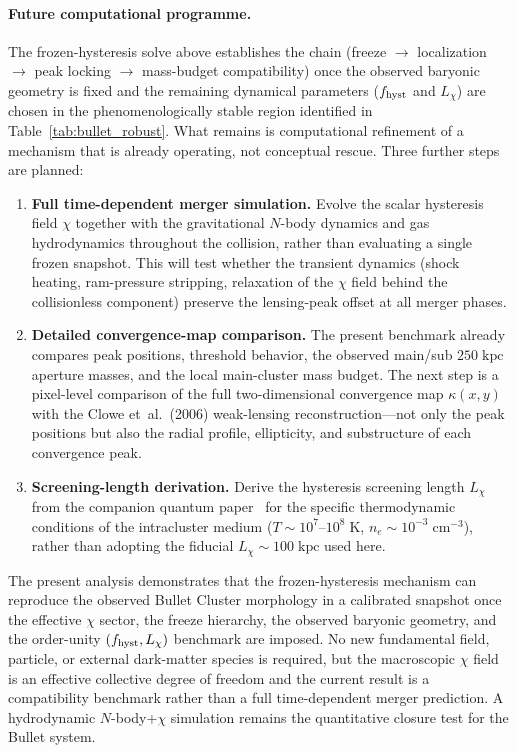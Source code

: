 \documentclass[11pt]{article}
\begin{document}
\paragraph{Future computational programme.}
The frozen-hysteresis solve above establishes the chain
(freeze $\to$ localization $\to$ peak locking $\to$
mass-budget compatibility) once the observed baryonic
geometry is fixed and the remaining dynamical parameters
($f_{\rm hyst}$ and $L_\chi$) are chosen in the
phenomenologically stable region identified in
Table~\ref{tab:bullet_robust}.
What remains is computational refinement of a mechanism that
is already operating, not conceptual rescue.  Three further
steps are planned:
\begin{enumerate}
  \item \textbf{Full time-dependent merger simulation.}
    Evolve the scalar hysteresis field $\chi$ together with the
    gravitational $N$-body dynamics and gas hydrodynamics throughout
    the collision, rather than evaluating a single frozen snapshot.
    This will test whether the transient dynamics (shock heating,
    ram-pressure stripping, relaxation of the $\chi$ field behind the
    collisionless component) preserve the lensing-peak offset at all
    merger phases.
  \item \textbf{Detailed convergence-map comparison.}
    The present benchmark already compares peak positions, threshold
    behavior, the observed main/sub $250\;\mathrm{kpc}$ aperture
    masses, and the local main-cluster mass budget.  The next step is a
    pixel-level comparison of the full two-dimensional convergence map
    $\kappa(x,y)$ with the Clowe et~al.\ (2006) weak-lensing
    reconstruction---not only the peak positions but also the radial
    profile, ellipticity, and substructure of each convergence peak.
  \item \textbf{Screening-length derivation.}
    Derive the hysteresis screening length $L_\chi$ from the companion
    quantum paper~\cite{Lotishvili2026Q} for the specific
    thermodynamic conditions of the intracluster medium
    ($T\sim10^{7}\text{--}10^{8}\;\mathrm{K}$,
    $n_e\sim10^{-3}\;\mathrm{cm^{-3}}$), rather than adopting the
    fiducial $L_\chi\sim100\;\mathrm{kpc}$ used here.
\end{enumerate}
The present analysis demonstrates that the frozen-hysteresis
mechanism can reproduce the observed Bullet Cluster morphology in a
calibrated snapshot once the effective $\chi$ sector, the freeze
hierarchy, the observed baryonic geometry, and the order-unity
$(f_{\rm hyst},L_\chi)$ benchmark are imposed.  No new fundamental
field, particle, or external dark-matter species is required, but the
macroscopic $\chi$ field is an effective collective degree of freedom
and the current result is a compatibility benchmark rather than a full
time-dependent merger prediction.  A hydrodynamic $N$-body+$\chi$
simulation remains the quantitative closure test for the Bullet system.
\end{document}
